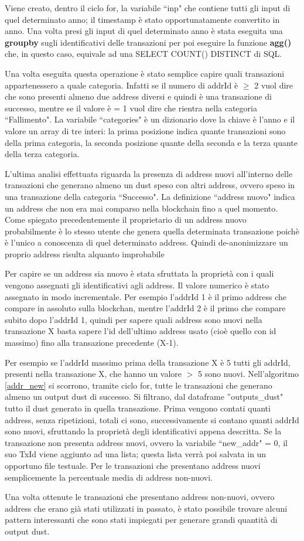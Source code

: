 Viene creato, dentro il ciclo for, la variabile ``inp" che contiene tutti gli input di quel determinato anno; il timestamp è stato opportunatamente convertito in anno. Una volta presi gli input di quel determinato anno è stata eseguita una \textbf{groupby} sugli identificativi delle transazioni per poi eseguire la funzione \textbf{agg({})} che, in questo caso, equivale ad una SELECT COUNT() DISTINCT di SQL.

Una volta eseguita questa operazione è stato semplice capire quali transazioni appartenessero a quale categoria. Infatti se il numero di addrId è $\ge$ 2 vuol dire che sono presenti almeno due address diversi e quindi è una transazione di successo, mentre se il valore è = 1 vuol dire che rientra nella categoria ``Fallimento". 
La variabile ``categories" è un dizionario dove la chiave è l'anno e il valore un array di tre interi: la prima posizione indica quante transazioni sono della prima categoria, la seconda posizione quante della seconda e la terza quante della terza categoria. 


L'ultima analisi effettuata riguarda la presenza di address nuovi all'interno delle transazioni che generano almeno un dust speso con altri address, ovvero speso in una transazione della categoria ``Successo". La definizione ``address nuovo" indica un address che non era mai comparso nella blockchain fino a quel momento. Come spiegato precedentemente il proprietario di un address nuovo probabilmente è lo stesso utente che genera quella determinata transazione poichè è l’unico a conoscenza di quel determinato address. Quindi de-anonimizzare un proprio address risulta alquanto improbabile

Per capire se un address sia nuovo è stata sfruttata la proprietà con i quali vengono assegnati gli identificativi agli address. Il valore numerico è stato assegnato in modo incrementale. Per esempio l’addrId 1 è il primo address che compare in assoluto sulla blockchan, mentre l’addrId 2 è il primo che compare subito dopo l’addrId 1, quindi per sapere quali address sono nuovi nella transazione X basta sapere l'id dell'ultimo address usato (cioè quello con id massimo) fino alla transazione precedente (X-1). 

Per esempio se l'addrId massimo prima della transazione X è 5 tutti gli addrId, presenti nella transazione X, che hanno un valore $>$ 5 sono nuovi. Nell'algoritmo \ref{addr_new} si scorrono, tramite ciclo for, tutte le transazioni che generano almeno un output dust di successo. Si filtrano, dal dataframe ''outputs\_dust" tutto il dust generato in quella transazione. Prima vengono contati quanti address, senza ripetizioni, totali ci sono, successivamente si contano quanti addrId sono nuovi, sfruttando la proprietà degli identificativi appena descritta. Se la transazione non presenta address nuovi, ovvero la variabile ``new\_addr" = 0, il suo TxId viene aggiunto ad una lista; questa lista verrà poi salvata in un opportuno file testuale. Per le transazioni che presentano address nuovi semplicemente la percentuale media di address non-nuovi.


Una volta ottenute le transazioni che presentano address non-nuovi, ovvero address che erano già stati utilizzati in passato, è stato possibile trovare alcuni pattern interessanti che sono stati impiegati per generare grandi quantità di output dust. 
